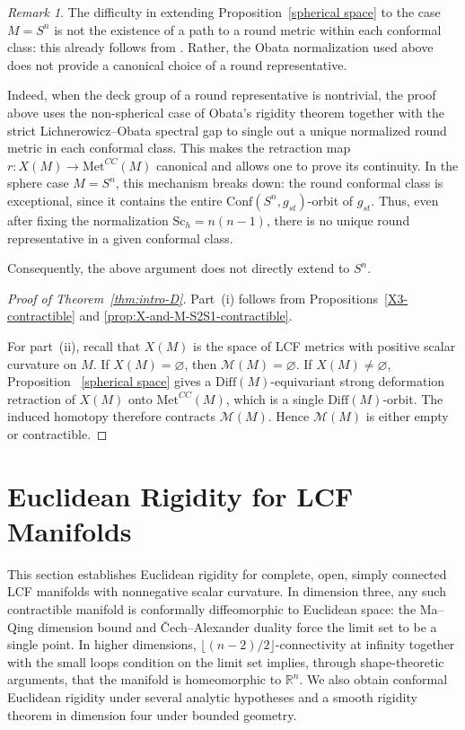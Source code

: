 \documentclass[12pt,oneside,a4paper]{article}
\theoremstyle{mytheorem}
\theoremstyle{remark}
\newtheorem{remark}[definition]{Remark}
\theoremstyle{definition}
\begin{document}
\begin{remark}
The difficulty in extending Proposition~\ref{spherical space} to the case
\(M=S^n\) is not the existence of a path to a round metric within each conformal
class: this already follows from \cite[Corollary~3.2]{MR2950765}.
Rather, the Obata normalization used above does not provide a canonical choice of a round representative.

Indeed, when the deck group of a round representative is nontrivial, the proof
above uses the non-spherical case of Obata's rigidity theorem together with the
strict Lichnerowicz--Obata spectral gap
to single out a unique normalized round metric in each conformal class. This makes
the retraction map \(r\colon X(M) \to \mathrm{Met}^{CC}(M)\) canonical and allows one to prove
its continuity. In the sphere case \(M=S^n\), this mechanism breaks down: the round
conformal class is exceptional, since it contains the entire
\(\mathrm{Conf}(S^n,g_{st})\)-orbit of \(g_{st}\). Thus, even after fixing the normalization \(\mathrm{Sc}_h=n(n-1)\), there is no unique round representative in a given conformal class.

Consequently, the above argument does not directly extend to \(S^n\).
\end{remark}

\begin{proof}[Proof of Theorem~\ref{thm:intro-D}]
Part~(i) follows from Propositions~\ref{X3-contractible} and
\ref{prop:X-and-M-S2S1-contractible}.

For part~(ii), recall that $X(M)$ is the space of LCF metrics with positive
scalar curvature on $M$. If $X(M)=\varnothing$, then
$\mathcal{M}(M)=\varnothing$. If $X(M)\neq\varnothing$, Proposition~
\ref{spherical space} gives a $\mathrm{Diff}(M)$-equivariant strong
deformation retraction of $X(M)$ onto $\mathrm{Met}^{CC}(M)$, which is a
single $\mathrm{Diff}(M)$-orbit. The induced homotopy therefore contracts
$\mathcal{M}(M)$. Hence $\mathcal{M}(M)$ is either empty or contractible.
\end{proof}


\section{Euclidean Rigidity for LCF Manifolds}\label{Euclidean 1}

This section establishes Euclidean rigidity for complete, open, simply connected LCF manifolds with nonnegative scalar curvature. In dimension three, any such contractible manifold is conformally diffeomorphic to Euclidean space: the Ma--Qing dimension bound and \v{C}ech--Alexander duality force the limit set to be a single point. In higher dimensions, \(\lfloor(n-2)/2\rfloor\)-connectivity at infinity together with the small loops condition on the limit set implies, through shape-theoretic arguments, that the manifold is homeomorphic to \(\mathbb{R}^n\). We also obtain conformal Euclidean rigidity under several analytic hypotheses and a smooth rigidity theorem in dimension four under bounded geometry.
\end{document}
